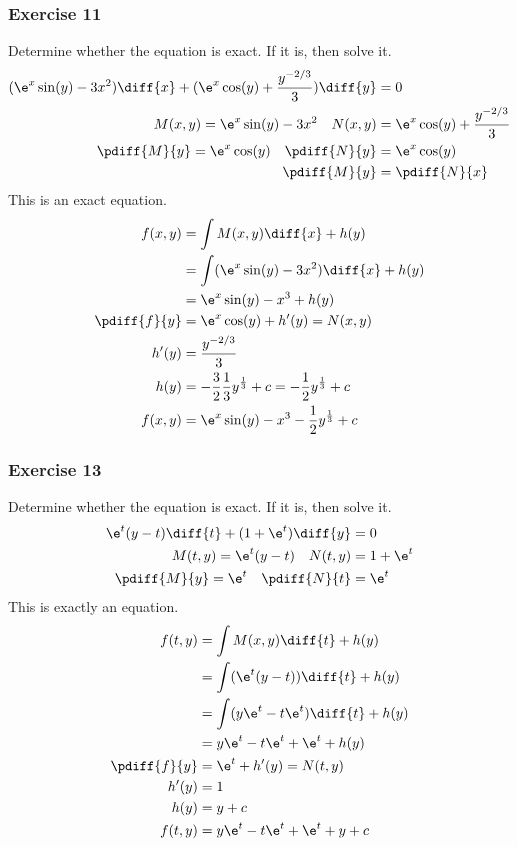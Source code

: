 \documentclass{math}
\begin{document}
\subsubsection*{Exercise 11}
Determine whether the equation is exact. If it is, then solve it.
\begin{align*}
  (\e^x\sin(y)-3x^2)\diff{x}+(\e^x\cos(y)+\frac{y^{-2/3}}{3})\diff{y} &= 0 \\
  M(x,y) = \e^x\sin(y)-3x^2 \quad N(x,y) &= \e^x\cos(y)+\frac{y^{-2/3}}{3} \\
  \pdiff{M}{y} = \e^x\cos(y) \quad \pdiff{N}{y} &= \e^x\cos(y) \\
  \pdiff{M}{y} &= \pdiff{N}{x}
\end{align*}
This is an exact equation.
\begin{align*}
  f(x,y) &= \int M(x,y)\diff{x}+h(y) \\
  &= \int(\e^x\sin(y)-3x^2)\diff{x}+h(y) \\
  &= \e^x\sin(y)-x^3+h(y) \\
  \pdiff{f}{y} &= \e^x\cos(y)+h'(y) = N(x,y) \\
  h'(y) &= \frac{y^{-2/3}}{3} \\
  h(y) &= -\frac{3}{2}\frac{1}{3}y^{\frac{1}{3}}+c =
    -\frac{1}{2}y^{\frac{1}{3}}+c \\
  f(x,y) &= \e^x\sin(y)-x^3-\frac{1}{2}y^{\frac{1}{3}}+c
\end{align*}

\subsubsection*{Exercise 13}
Determine whether the equation is exact. If it is, then solve it.
\begin{align*}
  \e^t(y-t)\diff{t}+(1+\e^t)\diff{y} &= 0 \\
  M(t,y) = \e^t(y-t) \quad N(t,y) &= 1+\e^t \\
  \pdiff{M}{y} = \e^t \quad \pdiff{N}{t} &= \e^t
\end{align*}
This is exactly an equation.
\begin{align*}
  f(t,y) &= \int M(x,y)\diff{t}+h(y) \\
  &= \int(\e^t(y-t))\diff{t}+h(y) \\
  &= \int(y\e^t-t\e^t)\diff{t}+h(y) \\
  &= y\e^t-t\e^t+\e^t+h(y) \\
  \pdiff{f}{y} &= \e^t+h'(y) = N(t,y) \\
  h'(y) &= 1 \\
  h(y) &= y+c \\
  f(t,y) &= y\e^t-t\e^t+\e^t+y+c \\
\end{align*}
\end{document}
